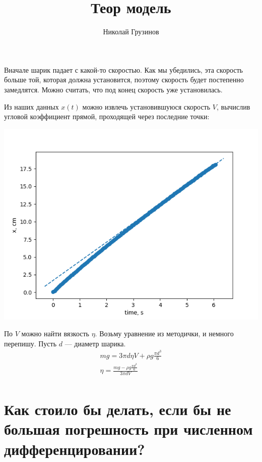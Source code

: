 \documentclass[a4paper, 12pt]{article}
\title{Теор модель}
\author{Николай Грузинов}
\date{}%
\begin{document}
\maketitle

Вначале шарик падает с какой-то скоростью.
Как мы убедились, эта скорость больше той, которая должна установится, поэтому скорость будет постепенно замедлятся.
Можно считать, что под конец скорость уже установилась.

Из наших данных $x(t)$ можно извлечь установившуюся скорость $V$, вычислив угловой коэффициент прямой, проходящей через последние точки:
\begin{center}
\includegraphics[width=0.7\linewidth]{approximation_0.png}
\end{center}

По $V$ можно найти вязкость $\eta$.
Возьму уравнение из методички, и немного перепишу.
Пусть $d$ --- диаметр шарика.
\begin{gather*}
    m g = 3 \pi d \eta V+\rho g \frac{\pi d^{3}}{6}\\
    \eta = \frac{m g-\rho g \frac{\pi d^{3}}{6} }{3 \pi d V}\\
\end{gather*}

\section*{Как стоило бы делать, если бы не большая погрешность при численном дифференцировании?}
\end{document}
